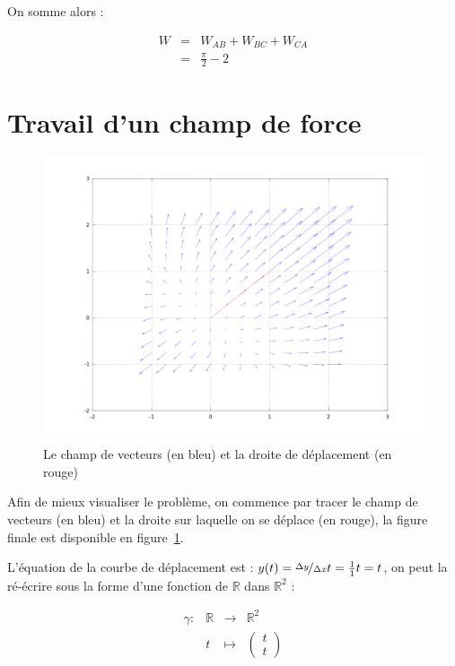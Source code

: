 \documentclass[a4paper, 11pt]{report} %
\newcommand{\R}{\mathbb{R}}
\renewcommand{\mapsto}{\longmapsto}
\begin{document}
On somme alors :

\begin{eqnarray*}
W & = & W_{AB} + W_{BC} + W_{CA}\\
& = & \frac{\pi}{2} - 2
\end{eqnarray*}

\section{Travail d'un champ de force} %

\begin{figure}[!h]
    \includegraphics[width=15cm]{exo5.png}
    \caption{\label{fig_exo5} Le champ de vecteurs (en bleu) et la droite de déplacement (en rouge)}
\end{figure}
Afin de mieux visualiser le problème, on commence par tracer le champ de vecteurs (en bleu) et la droite sur laquelle on se
déplace (en rouge), la figure finale est disponible en figure~\ref{fig_exo5}.

L'équation de la courbe de déplacement est : $y(t) = \nicefrac{\Delta y}{\Delta x}t = \frac{1}{1}t = t$, on peut la
ré-écrire sous la forme d'une fonction de $\R$ dans $\R^2$ : 

\[
\begin{array}{llll}
    \gamma : & \R & \longrightarrow & \R^2\\
    & t & \mapsto & \begin{pmatrix}t\\t\end{pmatrix}
\end{array}
\]
\end{document}

